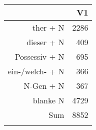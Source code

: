 \begin{tabular}{rr}
  \lsptoprule
 & V1 \\ 
  \midrule
ther + N & 2286 \\ 
  dieser + N & 409 \\ 
  Possessiv + N & 695 \\ 
  ein-/welch- + N & 366 \\ 
  N-Gen + N & 367 \\ 
  blanke N & 4729 \\ 
  Sum & 8852 \\ 
   \lspbottomrule
\end{tabular}

